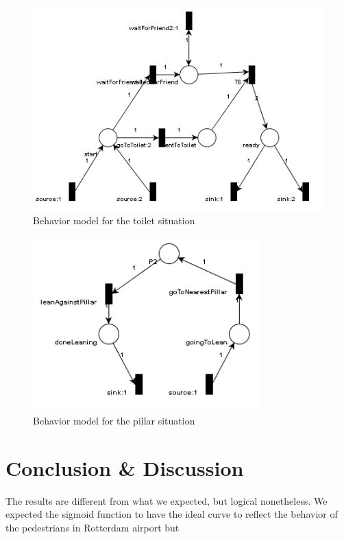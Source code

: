 \documentclass[11pt]{book}
\begin{document}
\begin{figure}
\centering
\includegraphics[width=350pt]{twoPeopleToiletSituation}
\caption{Behavior model for the toilet situation}
\label{toiletsituation}
\end{figure}

\begin{figure}
\centering
\includegraphics[width=250pt]{pillarSituation}
\caption{Behavior model for the pillar situation}
\label{toiletsituation}
\end{figure}



\section{Conclusion \& Discussion}
The results are different from what we expected, but logical nonetheless. We expected the sigmoid function to have the ideal curve to reflect the behavior of the pedestrians in Rotterdam airport but
\end{document}
